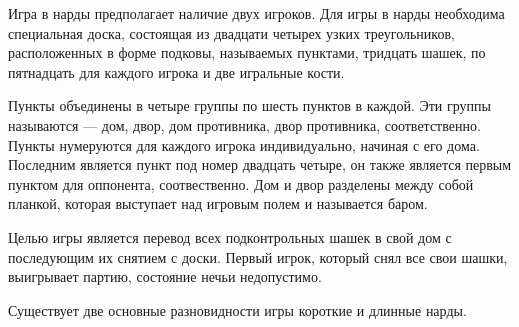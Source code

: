Игра в нарды предполагает наличие двух игроков. Для игры в нарды необходима специальная доска, состоящая из двадцати четырех узких треугольников, расположенных в форме подковы, называемых пунктами, тридцать шашек, по пятнадцать для каждого игрока и две игральные кости.

Пункты объединены в четыре группы по шесть пунктов в каждой. Эти группы называются --- дом, двор, дом противника, двор противника, соответственно. Пункты нумеруются для каждого игрока индивидуально, начиная с его дома. Последним является пункт под номер двадцать четыре, он также является первым пунктом для оппонента, соотвественно. Дом и двор разделены между собой планкой, которая выступает над игровым полем и называется баром.

Целью игры является перевод всех подконтрольных шашек в свой дом с последующим их снятием с доски. Первый игрок, который снял все свои шашки, выигрывает партию, состояние нечьи недопустимо.

Существует две основные разновидности игры короткие и длинные нарды.

